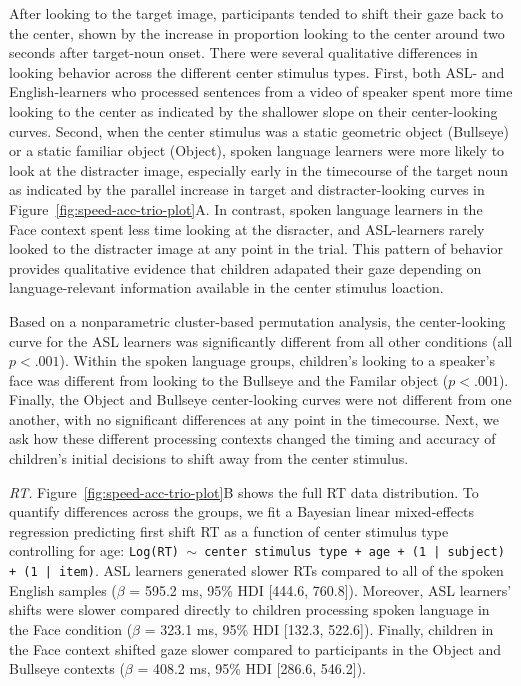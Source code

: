 \documentclass[oneside]{report}
\begin{document}
After looking to the target image, participants tended to shift their
gaze back to the center, shown by the increase in proportion looking to
the center around two seconds after target-noun onset. There were
several qualitative differences in looking behavior across the different
center stimulus types. First, both ASL- and English-learners who
processed sentences from a video of speaker spent more time looking to
the center as indicated by the shallower slope on their center-looking
curves. Second, when the center stimulus was a static geometric object
(Bullseye) or a static familiar object (Object), spoken language
learners were more likely to look at the distracter image, especially
early in the timecourse of the target noun as indicated by the parallel
increase in target and distracter-looking curves in
Figure~\ref{fig:speed-acc-trio-plot}A. In contrast, spoken language
learners in the Face context spent less time looking at the disracter,
and ASL-learners rarely looked to the distracter image at any point in
the trial. This pattern of behavior provides qualitative evidence that
children adapated their gaze depending on language-relevant information
available in the center stimulus loaction.

Based on a nonparametric cluster-based permutation analysis, the
center-looking curve for the ASL learners was significantly different
from all other conditions (all \(p < .001\)). Within the spoken language
groups, children's looking to a speaker's face was different from
looking to the Bullseye and the Familar object (\(p < .001\)). Finally,
the Object and Bullseye center-looking curves were not different from
one another, with no significant differences at any point in the
timecourse. Next, we ask how these different processing contexts changed
the timing and accuracy of children's initial decisions to shift away
from the center stimulus.

\emph{RT.} Figure~\ref{fig:speed-acc-trio-plot}B shows the full RT data
distribution. To quantify differences across the groups, we fit a
Bayesian linear mixed-effects regression predicting first shift RT as a
function of center stimulus type controlling for age:
\texttt{Log(RT) $\sim$ center stimulus type + age +  (1 | subject) + (1 | item)}.
ASL learners generated slower RTs compared to all of the spoken English
samples (\(\beta\) = 595.2 ms, 95\% HDI {[}444.6, 760.8{]}). Moreover,
ASL learners' shifts were slower compared directly to children
processing spoken language in the Face condition (\(\beta\) = 323.1 ms,
95\% HDI {[}132.3, 522.6{]}). Finally, children in the Face context
shifted gaze slower compared to participants in the Object and Bullseye
contexts (\(\beta\) = 408.2 ms, 95\% HDI {[}286.6, 546.2{]}).
\end{document}
